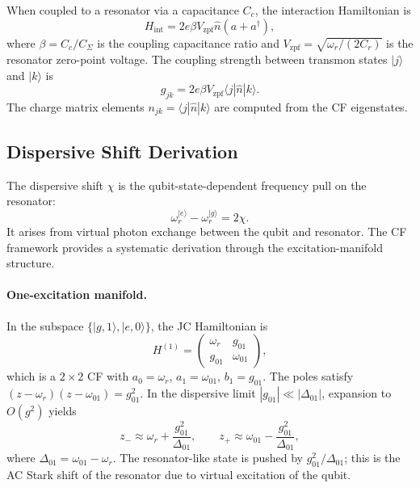 \documentclass[reprint, floatfix, superscriptaddress, amsmath, amssymb, longbibliography]{revtex4-2}
\begin{document}
When coupled to a resonator via a capacitance $C_c$, the interaction Hamiltonian is
\begin{equation}
H_{\mathrm{int}} = 2e\beta V_{\mathrm{zpf}} \hat{n}(a + a^\dagger),
\label{eq:capacitive_coupling}
\end{equation}
where $\beta = C_c/C_\Sigma$ is the coupling capacitance ratio and $V_{\mathrm{zpf}} = \sqrt{\omega_r/(2C_r)}$ is the resonator zero-point voltage. The coupling strength between transmon states $|j\rangle$ and $|k\rangle$ is
\begin{equation}
g_{jk} = 2e\beta V_{\mathrm{zpf}} \langle j|\hat{n}|k\rangle.
\label{eq:coupling_matrix_element}
\end{equation}
The charge matrix elements $n_{jk} = \langle j|\hat{n}|k\rangle$ are computed from the CF eigenstates. 

\subsection{Dispersive Shift Derivation}
\label{sec:dispersive_shift}

The dispersive shift $\chi$ is the qubit-state-dependent frequency pull on the resonator:
\begin{equation}
\omega_r^{|e\rangle} - \omega_r^{|g\rangle} = 2\chi.
\label{eq:chi_def}
\end{equation}
It arises from virtual photon exchange between the qubit and resonator. The CF framework provides a systematic derivation through the excitation-manifold structure.

\paragraph{One-excitation manifold.} In the subspace $\{|g,1\rangle, |e,0\rangle\}$, the JC Hamiltonian is
\begin{equation}
H^{(1)} = \begin{pmatrix}
\omega_r & g_{01} \\
g_{01} & \omega_{01}
\end{pmatrix},
\label{eq:H1}
\end{equation}
which is a $2\times 2$ CF with $a_0 = \omega_r$, $a_1 = \omega_{01}$, $b_1 = g_{01}$. The poles satisfy $(z - \omega_r)(z - \omega_{01}) = g_{01}^2$. In the dispersive limit $|g_{01}| \ll |\Delta_{01}|$, expansion to $O(g^2)$ yields
\begin{equation}
z_- \approx \omega_r + \frac{g_{01}^2}{\Delta_{01}}, \qquad z_+ \approx \omega_{01} - \frac{g_{01}^2}{\Delta_{01}},
\label{eq:one_exc_shifts}
\end{equation}
where $\Delta_{01} = \omega_{01} - \omega_r$. The resonator-like state is pushed by $g_{01}^2/\Delta_{01}$; this is the AC Stark shift of the resonator due to virtual excitation of the qubit.
\end{document}
